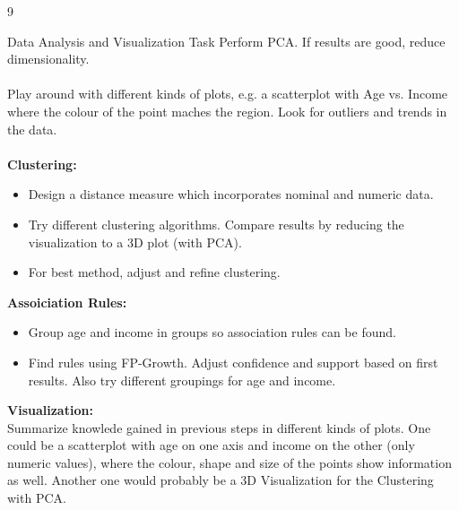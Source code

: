 \documentclass{article}
\begin{document}
\begin{ukon-infie}[17.01.18]{9}
\begin{exercise}[p=10]{Data Analysis and Visualization Task}
		Perform PCA. If results are good, reduce dimensionality.\\\\
		
		Play around with different kinds of plots, e.g. a scatterplot with Age vs. Income where the colour of the point maches the region. Look for outliers and trends in the data.\\\\	
		
		\textbf{Clustering:}
		\begin{itemize}
		\item Design a distance measure which incorporates nominal and numeric data.
		\item Try different clustering algorithms. Compare results by reducing the visualization to a 3D plot (with PCA).
		\item For best method, adjust and refine clustering.
		\end{itemize}
		
		\textbf{Assoiciation Rules:}
		\begin{itemize}
		\item Group age and income in groups so association rules can be found.
		\item Find rules using FP-Growth. Adjust confidence and support based on first results. Also try different groupings for age and income.
		
		\end{itemize}
		
		
		
		\textbf{Visualization:}\\
		Summarize knowlede gained in previous steps in different kinds of plots.  One could be a scatterplot with age on one axis and income on the other (only numeric values), where the colour, shape and size of the points show information as well. Another one would probably be a 3D Visualization for the Clustering with PCA.
				
		\end{exercise}
		
		
\end{ukon-infie}
\end{document}
